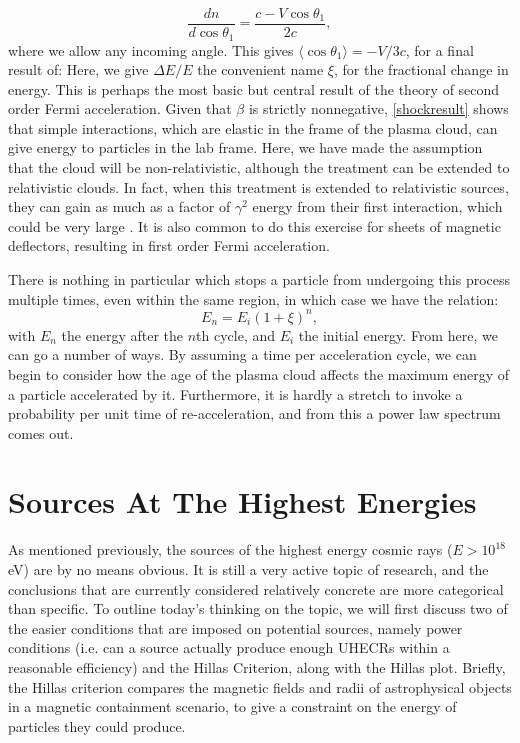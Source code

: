 $$\frac{dn}{d\cos\theta_1}=\frac{c-V\cos\theta_1}{2c},$$
where we allow any incoming angle. This gives $\langle\cos\theta_1\rangle=-V/3c$, for a final result of:
Here, we give $\Delta E/E$ the convenient name $\xi$, for the fractional change in energy. This is perhaps the most basic but central result of the theory of second order Fermi acceleration. Given that $\beta$ is strictly nonnegative, \autoref{shockresult} shows that simple interactions, which are elastic in the frame of the plasma cloud, can give energy to particles in the lab frame. Here, we have made the assumption that the cloud will be non-relativistic, although the treatment can be extended to relativistic clouds. In fact, when this treatment is extended to relativistic sources, they can gain as much as a factor of $\gamma^2$ energy from their first interaction, which could be very large \cite{shocks}. It is also common to do this exercise for sheets of magnetic deflectors, resulting in first order Fermi acceleration. 

There is nothing in particular which stops a particle from undergoing this process multiple times, even within the same region, in which case we have the relation:
$$E_n=E_i(1+\xi)^n,$$
with $E_n$ the energy after the $n$th cycle, and $E_i$ the initial energy. From here, we can go a number of ways. By assuming a time per acceleration cycle, we can begin to consider how the age of the plasma cloud affects the maximum energy of a particle accelerated by it. Furthermore, it is hardly a stretch to invoke a probability per unit time of re-acceleration, and from this a power law spectrum comes out.  

\section{Sources At The Highest Energies}\label{sources} %
As mentioned previously, the sources of the highest energy cosmic rays ($E>10^{18}$eV) are by no means obvious. It is still a very active topic of research, and the conclusions that are currently considered relatively concrete are more categorical than specific. To outline today's thinking on the topic, we will first discuss two of the easier conditions that are imposed on potential sources, namely power conditions (i.e. can a source actually produce enough UHECRs within a reasonable efficiency) and the Hillas Criterion, along with the Hillas plot. Briefly, the Hillas criterion compares the magnetic fields and radii of astrophysical objects in a magnetic containment scenario, to give a constraint on the energy of particles they could produce. 

